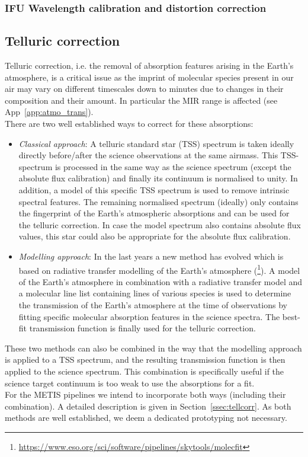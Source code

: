 \subsubsection{IFU Wavelength calibration and distortion correction}\label{ssec:criticalwavelengthanddistortionifu}

\subsection{Telluric correction}\label{ssec:criticaltelluriccorrection}
Telluric correction, i.e. the removal of absorption features arising in the Earth's atmosphere, is a critical issue as the imprint of molecular species present in our air may vary on different timescales down to minutes due to changes in their composition and their amount. In particular the \ac{MIR} range is affected (see App~\ref{app:atmo_trans}).\\
There are two well established ways to correct for these absorptions:
\begin{itemize}
    \item \textit{Classical approach}: A telluric standard star (\ac{TSS}) spectrum is taken ideally directly before/after the science observations at the same airmass. This \ac{TSS}-spectrum is processed in the same way as the science spectrum (except the absolute flux calibration) and finally its continuum is normalised to unity. In addition, a model of this specific \ac{TSS} spectrum is used to remove intrinsic spectral features. The remaining normalised spectrum (ideally) only contains the fingerprint of the Earth's atmospheric absorptions and can be used for the telluric correction. In case the model spectrum also contains absolute flux values, this star could also be appropriate for the absolute flux calibration.
    \item \textit{Modelling approach}: In the last years a new method has evolved which is based on radiative transfer modelling of the Earth's atmosphere (\cite{mf1, mf2, molecfit}\footnote{\url{https://www.eso.org/sci/software/pipelines/skytools/molecfit}}). A model of the Earth's atmosphere in combination with a radiative transfer model and a molecular line list containing lines of various species is used to determine the transmission of the Earth's atmosphere at the time of observations by fitting specific molecular absorption features in the science spectra. The best-fit transmission function is finally used for the telluric correction.
\end{itemize}
These two methods can also be combined in the way that the modelling approach is applied to a \ac{TSS} spectrum, and the resulting transmission function is then applied to the science spectrum. This combination is specifically useful if the science target continuum is too weak to use the absorptions for a fit.\\
For the \ac{METIS} pipelines we intend to incorporate both ways (including their combination). A detailed description is given in Section~\ref{ssec:tellcorr}. As both methods are well established, we deem a dedicated prototyping not necessary.

